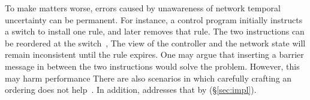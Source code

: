 To make matters worse, errors caused by unawareness of network temporal uncertainty can be permanent. 
For instance, a control program initially instructs a switch to install one rule, and later removes that rule.
The two instructions can be reordered at the switch~\cite{verified-pldi13}, %
The view of the controller and the network state will remain inconsistent until the rule expires.
One may argue that inserting a barrier message in between the two instructions would solve the problem. 
However, this may harm performance  %
There are also scenarios in which carefully crafting an ordering does not help~\cite{Reitblatt2012}. In addition, %
\name addresses that by  (\S\ref{sec:impl}).

%

